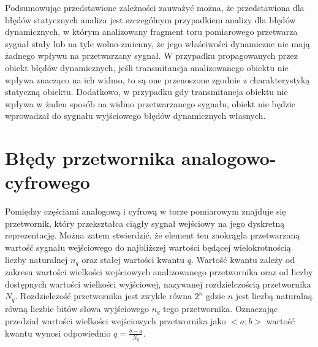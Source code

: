 Podsumowując przedstawione zależności zauważyć można, że przedstawiona dla błędów statycznych analiza jest szczególnym przypadkiem analizy dla błędów dynamicznych, w którym analizowany fragment toru pomiarowego przetwarza sygnał stały lub na tyle wolno-zmienny, że jego właściwości dynamiczne nie mają żadnego wpływu na przetwarzany sygnał. W przypadku propagowanych przez obiekt błędów dynamicznych, jeśli transmitancja analizowanego obiektu nie wpływa znacząco na ich widmo, to są one przenoszone zgodnie z charakterystyką statyczną obiektu. Dodatkowo, w przypadku gdy transmitancja obiektu nie wpływa w żaden sposób na widmo przetwarzanego sygnału, obiekt nie będzie wprowadzał do sygnału wyjściowego błędów dynamicznych własnych.

\section{Błędy przetwornika analogowo-cyfrowego}

Pomiędzy częściami analogową i cyfrową w torze pomiarowym znajduje się przetwornik, który przekształca ciągły sygnał wejściowy na jego dyskretną reprezentację. Można zatem stwierdzić, że element ten zaokrągla przetwarzaną wartość sygnału wejściowego do najbliższej wartości będącej wielokrotnością liczby naturalnej $n_{q}$ oraz stałej wartości kwantu $q$. Wartość kwantu zależy od zakresu wartości wielkości wejściowych analizowanego przetwornika oraz od liczby dostępnych wartości wielkości wyjściowej, nazywanej rozdzielczością przetwornika $N_{q}$. Rozdzielczość przetwornika jest zwykle równa $2^{n}$ gdzie $n$ jest liczbą naturalną równą liczbie bitów słowa wyjściowego $n_{q}$ tego przetwornika. Oznaczając przedział wartości wielkości wejściowych przetwornika jako $<a;b>$ wartość kwantu wynosi odpowiednio $q = \frac{b - a}{N_{q}}$.

